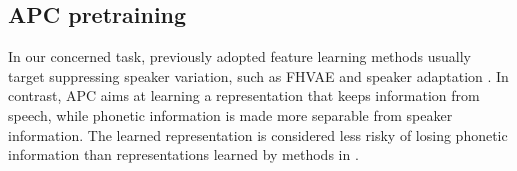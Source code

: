 \documentclass[a4paper]{article}
\begin{document}
\subsection{APC pretraining}
\label{subsec:apc}
In our concerned task, previously adopted feature learning methods 
usually target suppressing speaker variation, such as FHVAE \cite{Feng2019improving} and speaker adaptation \cite{heck2017feature}. In contrast, 
APC aims at learning
a representation that keeps information from speech, while phonetic information is made more separable from speaker information. The learned representation is considered less risky of losing phonetic information than 
  representations learned by methods in \cite{Feng2019improving,heck2017feature}.


\end{document}
